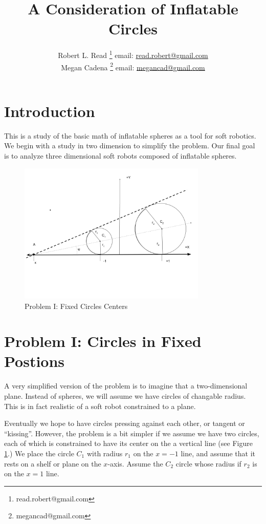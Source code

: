 \documentclass{article}
\title{A Consideration of Inflatable Circles}
\author{Robert L. Read
  \thanks{read.robert@gmail.com}
  email: \href{mailto:read.robert@gmail.com}{read.robert@gmail.com}\\
Megan Cadena
  \thanks{megancad@gmail.com}
  email: \href{mailto:megancad@gmail.com}{megancad@gmail.com}
  }
\begin{document}
\maketitle

\section{Introduction}
This is a study of the basic math of inflatable spheres as a tool for soft robotics.
We begin with a study in two dimension to simplify the problem.
Our final goal is to analyze three dimensional soft robots composed of inflatable
spheres.

\begin{figure}
     \centering
     \includegraphics[width=0.80\textwidth]{figures/FixedAxisCircles.png}
     \caption{Problem I: Fixed Circles Centers}
  \label{fig:fixed}
\end{figure}

\section{Problem I: Circles in Fixed Postions}

A very simplified version of the problem is to imagine that a two-dimensional
plane.  Instead of spheres, we will assume we have circles of changable radius.
This is in fact realistic of a soft robot constrained to a plane.




Eventually we hope to have circles pressing against each other, or tangent
or ``kissing''. However, the problem is a bit simpler if we assume we have
two circles, each of which is constrained to have its center on the a vertical
line (see Figure \ref{fig:fixed}.)  We place the circle $C_1$ with radius $r_1$ on the $x = -1$ line, and
assume that it rests on a shelf or plane on the $x$-axis.
Assume the $C_2$ circle whose radius if $r_2$ is on the $x = 1$ line.
\end{document}
